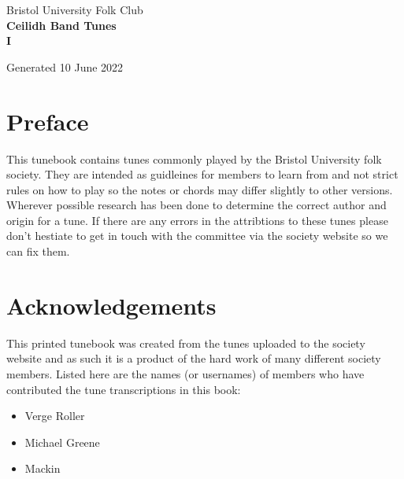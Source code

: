 \documentclass[12pt,a4paper,twoside]{article}
\makeatletter
\newcommand{\thetitle}{Ceilidh Band Tunes \\ \vspace{0.65cm} I}
\newcommand{\thedate}{10 June 2022}
\renewcommand\tableofcontents{%
    \begin{multicols}{2}[
      \centering
      \section*{\large\contentsname
        \@mkboth{%
           \MakeUppercase\contentsname}{\MakeUppercase\contentsname}}]
    \@starttoc{toc}%
    \end{multicols}
}
\makeatother
\begin{document}
\begin{titlepage}
   \begin{center}
       \large Bristol University Folk Club \\

       \vspace{4cm}
       \textbf{\Huge \thetitle}

       \vspace{0.5cm}
       Generated \thedate

       \vspace{1.5cm}

       \vfill

   \end{center}
\end{titlepage}

\tableofcontents

\section{Preface}

This tunebook contains tunes commonly played by the Bristol University folk society. They are intended as guidleines for members to learn from and not strict rules on how to play so the notes or chords may differ slightly to other versions.
Wherever possible research has been done to determine the correct author and origin for a tune. If there are any errors in the attribtions to these tunes please don't hestiate to get in touch with the committee via the society website so we can fix them.

\section{Acknowledgements}

This printed tunebook was created from the tunes uploaded to the society website and as such it is a product of the hard work of many different society members. Listed here are the names (or usernames) of members who have contributed the tune transcriptions in this book:

\begin{multicols}{2}
\begin{itemize}\item Verge Roller
\item Michael Greene
\item Mackin
\end{itemize}

\end{multicols}
\end{document}
